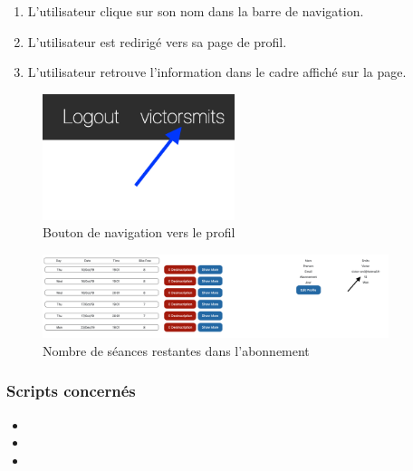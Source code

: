 \begin{enumerate}
	\item L'utilisateur clique sur son nom dans la barre de navigation.
	\item L'utilisateur est redirigé vers sa page de profil. 
	\item L'utilisateur retrouve l'information dans le cadre affiché sur la page.
\end{enumerate}

\vspace{\baselineskip}
\begin{figure}[h]
	\includegraphics[width=0.5\textwidth,center]{Figures/us7-1}
	\caption{Bouton de navigation vers le profil}
\end{figure}

\vspace{\baselineskip}
\begin{figure}[h]
	\includegraphics[width=0.9\textwidth,center]{Figures/us7-2}
	\caption{Nombre de séances restantes dans l'abonnement}
\end{figure}


\vspace{\baselineskip}
\subsubsection{Scripts concernés}
	\begin{itemize}
		\item {}
		\item {}
		\item {}
	\end{itemize}
